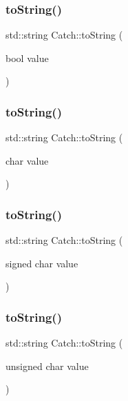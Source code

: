 \subsubsection{\texorpdfstring{to\+String()}{toString()}\hspace{0.1cm}{\footnotesize\ttfamily [13/17]}}
{\footnotesize\ttfamily std\+::string Catch\+::to\+String (\begin{DoxyParamCaption}\item[{bool}]{value }\end{DoxyParamCaption})}

\hypertarget{namespace_catch_a25a0a78cbb62ea08b5d49e443051c387}{}\label{namespace_catch_a25a0a78cbb62ea08b5d49e443051c387} 
\subsubsection{\texorpdfstring{to\+String()}{toString()}\hspace{0.1cm}{\footnotesize\ttfamily [14/17]}}
{\footnotesize\ttfamily std\+::string Catch\+::to\+String (\begin{DoxyParamCaption}\item[{char}]{value }\end{DoxyParamCaption})}

\hypertarget{namespace_catch_a0a5d9d0965d0d2a0663773732283713e}{}\label{namespace_catch_a0a5d9d0965d0d2a0663773732283713e} 
\subsubsection{\texorpdfstring{to\+String()}{toString()}\hspace{0.1cm}{\footnotesize\ttfamily [15/17]}}
{\footnotesize\ttfamily std\+::string Catch\+::to\+String (\begin{DoxyParamCaption}\item[{signed char}]{value }\end{DoxyParamCaption})}

\hypertarget{namespace_catch_a5d83eaeb68579a556c86cc05f7a7765f}{}\label{namespace_catch_a5d83eaeb68579a556c86cc05f7a7765f} 
\subsubsection{\texorpdfstring{to\+String()}{toString()}\hspace{0.1cm}{\footnotesize\ttfamily [16/17]}}
{\footnotesize\ttfamily std\+::string Catch\+::to\+String (\begin{DoxyParamCaption}\item[{unsigned char}]{value }\end{DoxyParamCaption})}

